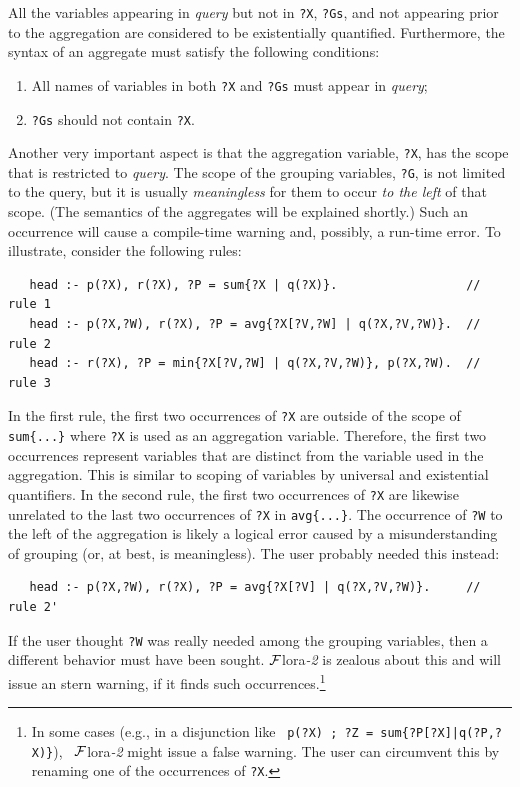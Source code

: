 \documentclass[11pt]{article}
\newcommand{\FLORA}{{\mbox{\sc ${\cal F}${lora}\rm\emph{-2}}}\xspace}
\newcommand{\FLSYSTEM}{\FLORA}
\begin{document}
All the variables appearing in {\it query} but not in {\tt ?X}, {\tt ?Gs},
and not appearing prior to the aggregation are
considered to be existentially quantified. Furthermore, the syntax of an
aggregate must satisfy the following conditions:
\begin{enumerate}
\item All names of variables in both {\tt ?X} and {\tt ?Gs} must
appear in {\it query};
\item {\tt ?Gs} should not contain {\tt ?X}.
\end{enumerate}

Another very important aspect is that 
the aggregation variable, \texttt{?X}, 
has the scope that is restricted to \emph{query}.
The scope of the grouping variables, \texttt{?G}, is not limited to the query,
but it is usually \emph{meaningless} for them to occur \emph{to
  the left} of that scope. (The semantics of the aggregates will be
explained shortly.)
Such an occurrence will cause a compile-time warning and, possibly, a
run-time error.
To illustrate, consider the following rules:
\begin{verbatim}
   head :- p(?X), r(?X), ?P = sum{?X | q(?X)}.                  // rule 1
   head :- p(?X,?W), r(?X), ?P = avg{?X[?V,?W] | q(?X,?V,?W)}.  // rule 2
   head :- r(?X), ?P = min{?X[?V,?W] | q(?X,?V,?W)}, p(?X,?W).  // rule 3
\end{verbatim}
In the first rule,
the first two occurrences of \texttt{?X}
are outside of the
scope of \texttt{sum\{...\}}  where \texttt{?X} is used as an aggregation
variable. Therefore, the first two occurrences represent
variables that are distinct from
the variable used in the aggregation. This is similar to
scoping of variables by universal and existential quantifiers. 
In the second rule, the first two occurrences of \texttt{?X} are likewise
unrelated to the last two
occurrences of \texttt{?X} in \texttt{avg\{...\}}.
The occurrence of \texttt{?W} to the left of the aggregation is likely a logical
error caused by a misunderstanding of grouping
(or, at best, is meaningless). The user probably needed
this instead:
\begin{verbatim}
   head :- p(?X,?W), r(?X), ?P = avg{?X[?V] | q(?X,?V,?W)}.     // rule 2'
\end{verbatim}
If the user thought \texttt{?W} was really needed among the grouping variables,
then a different behavior must have been sought.
\FLSYSTEM is zealous about this and will issue an stern warning, if it
finds such occurrences.\footnote{
  In some cases (e.g., in a disjunction like~
  \texttt{p(?X) ; ?Z = sum\{?P[?X]|q(?P,?X)\}}),~
  \FLSYSTEM might issue a false warning. The user can
  circumvent this by renaming one of the occurrences of \texttt{?X}. 
}
\end{document}
